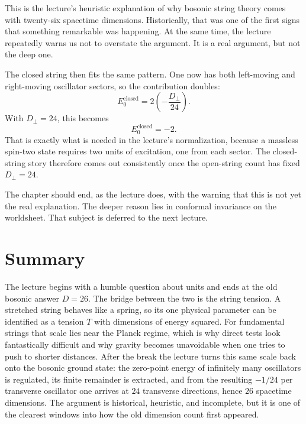 This is the lecture's heuristic explanation of why bosonic string theory comes with twenty-six spacetime dimensions. Historically, that was one of the first signs that something remarkable was happening. At the same time, the lecture repeatedly warns us not to overstate the argument. It is a real argument, but not the deep one.

The closed string then fits the same pattern. One now has both left-moving and right-moving oscillator sectors, so the contribution doubles:
\begin{equation}
E_{0}^{\text{closed}}
=
2\left(-\frac{D_{\perp}}{24}\right).
\end{equation}
With \(D_{\perp}=24\), this becomes
\begin{equation}
E_{0}^{\text{closed}}=-2.
\end{equation}
That is exactly what is needed in the lecture's normalization, because a massless spin-two state requires two units of excitation, one from each sector. The closed-string story therefore comes out consistently once the open-string count has fixed \(D_{\perp}=24\).

The chapter should end, as the lecture does, with the warning that this is not yet the real explanation. The deeper reason lies in conformal invariance on the worldsheet. That subject is deferred to the next lecture.

\section{Summary}

The lecture begins with a humble question about units and ends at the old bosonic answer \(D=26\). The bridge between the two is the string tension. A stretched string behaves like a spring, so its one physical parameter can be identified as a tension \(T\) with dimensions of energy squared. For fundamental strings that scale lies near the Planck regime, which is why direct tests look fantastically difficult and why gravity becomes unavoidable when one tries to push to shorter distances. After the break the lecture turns this same scale back onto the bosonic ground state: the zero-point energy of infinitely many oscillators is regulated, its finite remainder is extracted, and from the resulting \(-1/24\) per transverse oscillator one arrives at \(24\) transverse directions, hence \(26\) spacetime dimensions. The argument is historical, heuristic, and incomplete, but it is one of the clearest windows into how the old dimension count first appeared.